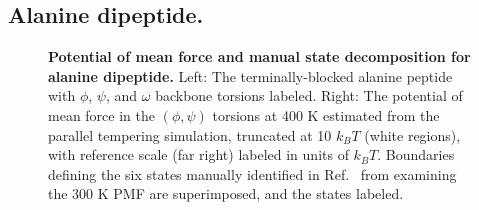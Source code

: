 \subsection{Alanine dipeptide.}


\begin{figure}[tb]
  \begin{center}
  \end{center}
  \caption{{\bf Potential of mean force and manual state decomposition for alanine dipeptide.}  
  Left: The terminally-blocked alanine peptide with $\phi$, $\psi$, and $\omega$ backbone torsions labeled.  
  Right: The potential of mean force in the $(\phi,\psi)$ torsions at 400 K estimated from the parallel tempering simulation, truncated at 10 $k_B T$ (white regions), with reference scale (far right) labeled in units of $k_B T$.  
  Boundaries defining the six states manually identified in Ref.\ \cite{chodera:mms:2006} from examining the 300 K PMF are superimposed, and the states labeled.}
  \label{automatic:figure:alanine-dipeptide-2d-pmf}
\end{figure}

